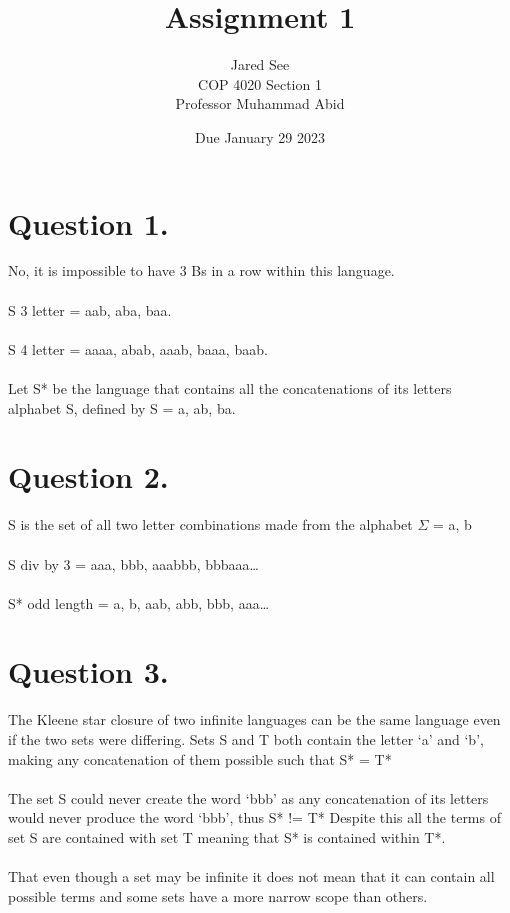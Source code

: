 \documentclass[titlepage]{article}
\title{Assignment 1}
\author{Jared See\\COP 4020 Section 1\\Professor Muhammad Abid}
\date{Due January 29 2023}
\begin{document}
\maketitle



\section*{Question 1.}
{
    No, it is impossible to have 3 Bs in a row within this language.\\\\
    S 3 letter = {aab, aba, baa}.\\\\
    S 4 letter = {aaaa, abab, aaab, baaa, baab}.\\\\
    Let S* be the language that contains all the concatenations of its letters\\ alphabet S,
    defined by S = {a,  ab,  ba}.
}
\section*{Question 2.}
{
    S is the set of all two letter combinations made from the alphabet $\Sigma$ = {a, b}\\\\
    S div by 3 = {aaa, bbb, aaabbb, bbbaaa…}\\\\
    S* odd length = {a, b, aab, abb, bbb, aaa…}
}
\section*{Question 3.}
{
    The Kleene star closure of two infinite languages can be the same language even if the two sets were differing. Sets S and T both contain the letter ‘a’ and ‘b’, making any concatenation of them possible such that S* = T*\\\\
    The set S could never create the word ‘bbb’ as any concatenation of its letters would never produce the word ‘bbb’, thus S* != T* Despite this all the terms of set S are contained with set T meaning that S* is contained within T*.\\\\
    That even though a set may be infinite it does not mean that it can contain all possible terms and some sets have a more narrow scope than others.

}
\end{document}
